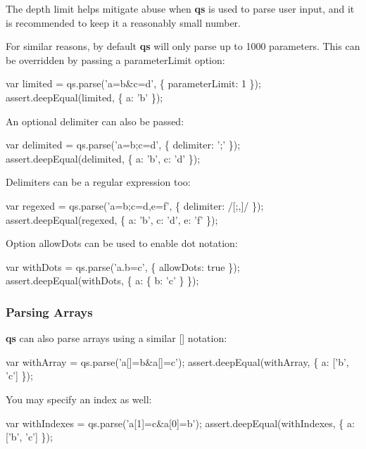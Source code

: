 The depth limit helps mitigate abuse when {\bfseries qs} is used to parse user input, and it is recommended to keep it a reasonably small number.

For similar reasons, by default {\bfseries qs} will only parse up to 1000 parameters. This can be overridden by passing a {\ttfamily parameter\+Limit} option\+:


\begin{DoxyCode}
var limited = qs.parse('a=b&c=d', \{ parameterLimit: 1 \});
assert.deepEqual(limited, \{ a: 'b' \});
\end{DoxyCode}


An optional delimiter can also be passed\+:


\begin{DoxyCode}
var delimited = qs.parse('a=b;c=d', \{ delimiter: ';' \});
assert.deepEqual(delimited, \{ a: 'b', c: 'd' \});
\end{DoxyCode}


Delimiters can be a regular expression too\+:


\begin{DoxyCode}
var regexed = qs.parse('a=b;c=d,e=f', \{ delimiter: /[;,]/ \});
assert.deepEqual(regexed, \{ a: 'b', c: 'd', e: 'f' \});
\end{DoxyCode}


Option {\ttfamily allow\+Dots} can be used to enable dot notation\+:


\begin{DoxyCode}
var withDots = qs.parse('a.b=c', \{ allowDots: true \});
assert.deepEqual(withDots, \{ a: \{ b: 'c' \} \});
\end{DoxyCode}


\subsubsection*{Parsing Arrays}

{\bfseries qs} can also parse arrays using a similar {\ttfamily \mbox{[}\mbox{]}} notation\+:


\begin{DoxyCode}
var withArray = qs.parse('a[]=b&a[]=c');
assert.deepEqual(withArray, \{ a: ['b', 'c'] \});
\end{DoxyCode}


You may specify an index as well\+:


\begin{DoxyCode}
var withIndexes = qs.parse('a[1]=c&a[0]=b');
assert.deepEqual(withIndexes, \{ a: ['b', 'c'] \});
\end{DoxyCode}


